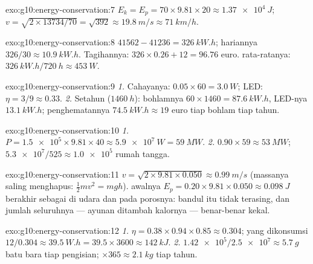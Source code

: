 \begin{solution}{exo:g10:energy-conservation:7}
$E_k = E_p = 70 \times 9.81 \times 20 \approx \qty{1.37e4}{J}$;
$v = \sqrt{2 \times 13734/70} = \sqrt{392} \approx \qty{19.8}{m/s}
\approx \qty{71}{km/h}$.
\end{solution}

\begin{solution}{exo:g10:energy-conservation:8}
$41562 - 41236 = \qty{326}{kW.h}$; hariannya $326/30 \approx
\qty{10.9}{kW.h}$. Tagihannya: $326 \times 0.26 + 12 = 96.76$ euro.
 rata-ratanya: $\qty{326}{kW.h}/\qty{720}{h} \approx \qty{453}{W}$.
\end{solution}

\begin{solution}{exo:g10:energy-conservation:9}
\emph{1.} Cahayanya: $0.05 \times 60 = \qty{3.0}{W}$; LED:
$\eta = 3/9 \approx 0.33$.
\emph{2.} Setahun ($\qty{1460}{h}$): bohlamnya
$60 \times 1460 = \qty{87.6}{kW.h}$, LED-nya $\qty{13.1}{kW.h}$;
penghematannya $\qty{74.5}{kW.h} \approx 19$ euro tiap bohlam tiap
tahun.
\end{solution}

\begin{solution}{exo:g10:energy-conservation:10}
\emph{1.} $P = \num{1.5e5} \times 9.81 \times 40 \approx
\qty{5.9e7}{W} = \qty{59}{MW}$.
\emph{2.} $0.90 \times 59 \approx \qty{53}{MW}$;
$\num{5.3e7}/525 \approx \num{1.0e5}$ rumah tangga.
\end{solution}

\begin{solution}{exo:g10:energy-conservation:11}
$v = \sqrt{2 \times 9.81 \times 0.050} \approx \qty{0.99}{m/s}$
(massanya saling menghapus: $\tfrac12 m v^2 = mgh$).  awalnya
$E_p = 0.20 \times 9.81 \times 0.050 \approx \qty{0.098}{J}$ berakhir
sebagai  di udara dan pada porosnya: bandul itu tidak
terasing, dan jumlah seluruhnya --- ayunan ditambah kalornya ---
benar-benar kekal.
\end{solution}

\begin{solution}{exo:g10:energy-conservation:12}
\emph{1.} $\eta = 0.38 \times 0.94 \times 0.85 \approx 0.304$; yang
dikonsumsi $12/0.304 \approx \qty{39.5}{W.h}
= 39.5 \times 3600 \approx \qty{142}{kJ}$.
\emph{2.} $\num{1.42e5}/\num{2.5e7} \approx \qty{5.7}{g}$ batu bara
tiap pengisian; $\times 365 \approx \qty{2.1}{kg}$ tiap tahun.
\end{solution}

